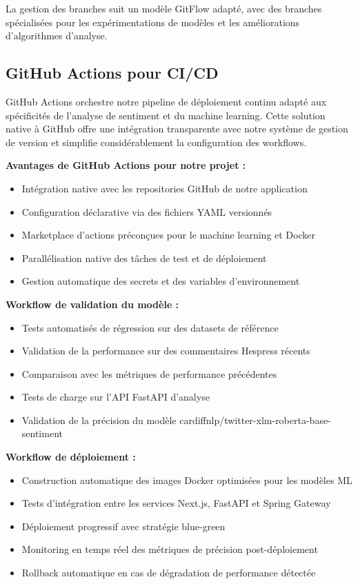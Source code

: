 La gestion des branches suit un modèle GitFlow adapté, avec des branches spécialisées pour les expérimentations de modèles et les améliorations d'algorithmes d'analyse.

\subsection{GitHub Actions pour CI/CD}
GitHub Actions orchestre notre pipeline de déploiement continu adapté aux spécificités de l'analyse de sentiment et du machine learning. Cette solution native à GitHub offre une intégration transparente avec notre système de gestion de version et simplifie considérablement la configuration des workflows.

\textbf{Avantages de GitHub Actions pour notre projet :}
\begin{itemize}
    \item Intégration native avec les repositories GitHub de notre application
    \item Configuration déclarative via des fichiers YAML versionnés
    \item Marketplace d'actions préconçues pour le machine learning et Docker
    \item Parallélisation native des tâches de test et de déploiement
    \item Gestion automatique des secrets et des variables d'environnement
\end{itemize}

\textbf{Workflow de validation du modèle :}
\begin{itemize}
    \item Tests automatisés de régression sur des datasets de référence
    \item Validation de la performance sur des commentaires Hespress récents
    \item Comparaison avec les métriques de performance précédentes
    \item Tests de charge sur l'API FastAPI d'analyse
    \item Validation de la précision du modèle cardiffnlp/twitter-xlm-roberta-base-sentiment
\end{itemize}

\textbf{Workflow de déploiement :}
\begin{itemize}
    \item Construction automatique des images Docker optimisées pour les modèles ML
    \item Tests d'intégration entre les services Next.js, FastAPI et Spring Gateway
    \item Déploiement progressif avec stratégie blue-green
    \item Monitoring en temps réel des métriques de précision post-déploiement
    \item Rollback automatique en cas de dégradation de performance détectée
\end{itemize}

